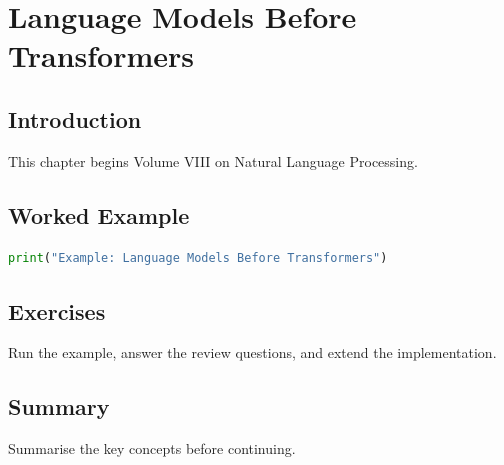 \chapter{Language Models Before Transformers}
\label{chap:vol8-4}



\section{Introduction}
This chapter begins Volume VIII on Natural Language Processing.

\section{Worked Example}
\begin{lstlisting}[language=Python]
print("Example: Language Models Before Transformers")
\end{lstlisting}

\section{Exercises}
\begin{exercise}
Run the example, answer the review questions, and extend the implementation.
\end{exercise}

\section{Summary}
Summarise the key concepts before continuing.
